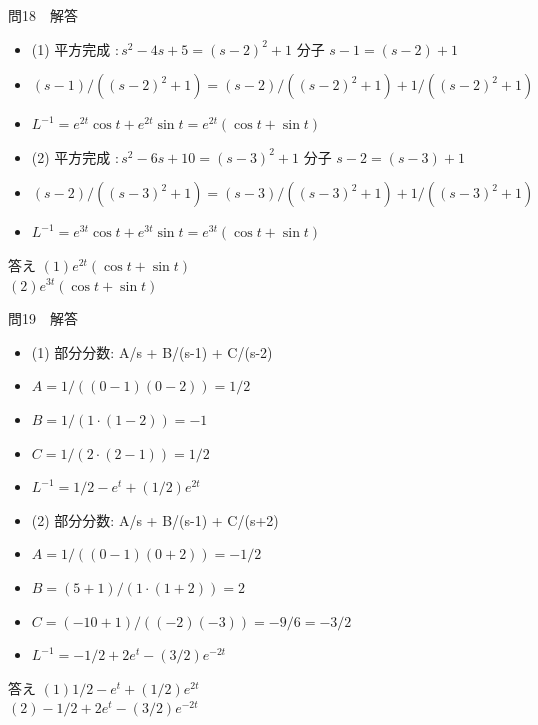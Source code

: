 \documentclass[aspectratio=43,professionalfonts,handout]{beamer}
\begin{document}
\begin{frame}{問18　解答}
  \begin{block}{}
  \begin{itemize}\setlength{\itemsep}{2pt}
    \item (1) 平方完成 $: s^{2}-4s+5 = (s-2)^{2}+1$ 分子 $s-1 = (s-2)+1$
    \item $    (s-1)/((s-2)^{2}+1) = (s-2)/((s-2)^{2}+1) + 1/((s-2)^{2}+1)$
    \item $    L^{-1} = e^{2t}\cos t + e^{2t}\sin t = e^{2t}(\cos t + \sin t)$
    \item (2) 平方完成 $: s^{2}-6s+10 = (s-3)^{2}+1$ 分子 $s-2 = (s-3)+1$
    \item $    (s-2)/((s-3)^{2}+1) = (s-3)/((s-3)^{2}+1) + 1/((s-3)^{2}+1)$
    \item $    L^{-1} = e^{3t}\cos t + e^{3t}\sin t = e^{3t}(\cos t + \sin t)$
  \end{itemize}
  \end{block}
  \begin{exampleblock}{答え}
  $(1) e^{2t}(\cos t + \sin t)$\\
  $(2) e^{3t}(\cos t + \sin t)$\\
  \end{exampleblock}
\end{frame}

\begin{frame}{問19　解答}
  \begin{block}{}
  \begin{itemize}\setlength{\itemsep}{2pt}
    \item (1) 部分分数: A/s + B/(s-1) + C/(s-2)
    \item $    A = 1/((0-1)(0-2)) = 1/2$
    \item $    B = 1/(1\cdot(1-2)) = -1$
    \item $    C = 1/(2\cdot(2-1)) = 1/2$
    \item $    L^{-1} = 1/2 - e^t + (1/2)e^{2t}$
    \item (2) 部分分数: A/s + B/(s-1) + C/(s+2)
    \item $    A = 1/((0-1)(0+2)) = -1/2$
    \item $    B = (5+1)/(1\cdot(1+2)) = 2$
    \item $    C = (-10+1)/((-2)(-3)) = -9/6 = -3/2$
    \item $    L^{-1} = -1/2 + 2e^t - (3/2)e^{-2t}$
  \end{itemize}
  \end{block}
  \begin{exampleblock}{答え}
  $(1) 1/2 - e^t + (1/2)e^{2t}$\\
  $(2) -1/2 + 2e^t - (3/2)e^{-2t}$\\
  \end{exampleblock}
\end{frame}
\end{document}
